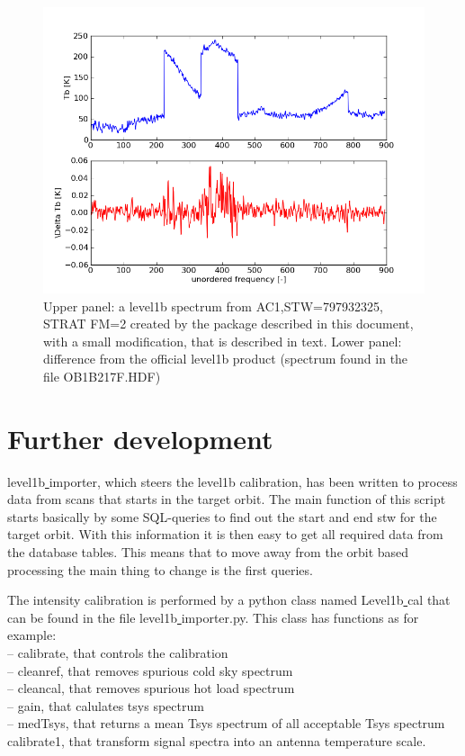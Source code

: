 \documentclass[12pt]{article}
\begin{document}
\begin{figure}[!t]
\centering
\includegraphics[scale=0.7]{spectrum.png}
\caption{Upper panel: a level1b spectrum from AC1,STW=797932325,
STRAT FM=2 created by the package described in this document,
with a small modification, that is described in text.
Lower panel: difference from the official level1b product
(spectrum found in the file OB1B217F.HDF) }
\label{fig:odin1}
\end{figure}



\section{Further development}
level1b\underline{ }importer, which steers the level1b
calibration, has been written to process data from scans
that starts in the target orbit.
The main function of this script starts basically by some
SQL-queries to find out the start and end stw for the target orbit.
With this information it is then easy to get all required
data from the database tables.
This means that to move away from the orbit based processing
the main thing to change is the first queries.

The intensity calibration is performed by a python class
named Level1b\underline{ }cal that can
be found in the file level1b\underline{ }importer.py.
This class has functions as for example:\\
-- calibrate, that controls the calibration\\
-- cleanref, that removes spurious cold sky spectrum\\
-- cleancal, that removes spurious hot load spectrum\\
-- gain, that calulates tsys spectrum\\
-- medTsys, that returns a mean Tsys spectrum of all acceptable
Tsys spectrum\\ 
calibrate1, that transform signal spectra into an antenna temperature
scale.
 
\end{document}
